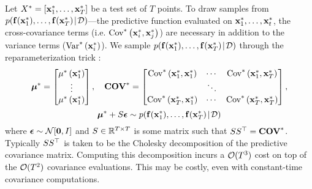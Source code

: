 Let $X^* = [ \mathbf{x}^*_1, \ldots, \mathbf{x}^*_T ]$ be a test set of $T$ points.
To draw samples from $p( \mathbf{f}(\mathbf{x}^*_1), \ldots, \mathbf{f}(\mathbf{x}^*_T) \! \mid \! \mathcal D)$---the predictive function evaluated on $\mathbf{x}^*_1, \ldots, \mathbf{x}^*_t$,
the cross-covariance terms (i.e. $\text{Cov}^* \left( \mathbf{x}^*_i, \mathbf{x}^*_j \right)$) are necessary in addition to the variance terms ($\text{Var}^* \left( \mathbf{x}^*_i \right)$).
We sample $p( \mathbf{f}(\mathbf{x}^*_1), \ldots, \mathbf{f}(\mathbf{x}^*_T) \! \mid \! \mathcal D)$ through the reparameterization trick \cite{kingma2014auto,rezende2014stochastic}:
%
\[
  \boldsymbol{\mu}^* = \begin{bmatrix} \mu^* \left( \mathbf{x}^*_1 \right) \\ \vdots \\ \mu^* \left( \mathbf{x}^*_1 \right) \end{bmatrix},
  \quad
  \textbf{COV}^* = \begin{bmatrix}
    \text{Cov}^* \left( \mathbf{x}^*_1, \mathbf{x}^*_1 \right) & \cdots & \text{Cov}^* \left( \mathbf{x}^*_1, \mathbf{x}^*_T \right) \\
    & \ddots & \\
    \text{Cov}^* \left( \mathbf{x}^*_T, \mathbf{x}^*_1 \right) & \cdots & \text{Cov}^* \left( \mathbf{x}^*_T, \mathbf{x}^*_T \right) \\
  \end{bmatrix},
\]
\begin{equation}
  \boldsymbol{\mu}^* + S \boldsymbol{\epsilon} \sim p( \mathbf{f}(\mathbf{x}^*_1), \ldots, \mathbf{f}(\mathbf{x}^*_T) \! \mid \! \mathcal D)
  \label{eqn:sample}
\end{equation}
%
where $\bepsilon \sim \normaldist{\bzero}{\bI}$ and $S \in \mathbb{R}^{T \times T}$ is some matrix such that $S S^\top = \textbf{COV}^*$.
Typically $S S^\top$ is taken to be the Cholesky decomposition of the predictive covariance matrix.
Computing this decomposition incurs a $\bigo{T^3}$ cost on top of the $\bigo{T^2}$ covariance evaluations.
This may be costly, even with constant-time covariance computations.

